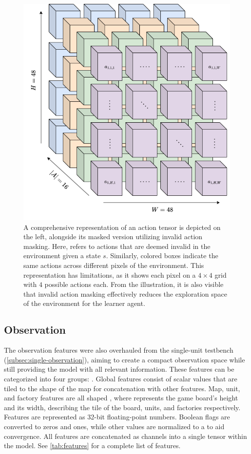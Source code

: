 \begin{figure}[htbp]
    \centering
    \includegraphics[width=0.5\linewidth]{images/methods_mono/action/action_space.png}
    \captionsetup{justification=justified, singlelinecheck=false, width=1\linewidth, labelfont=bf} 
    \caption[]{A comprehensive representation of an action tensor is depicted on the left, alongside its masked version utilizing invalid action masking. Here,  refers to actions that are deemed invalid in the environment given a state $s$. Similarly, colored boxes indicate the same actions across different pixels of the environment. This representation has limitations, as it shows each pixel on a $4\times4$ grid with $4$ possible actions each. From the illustration, it is also visible that invalid action masking effectively reduces the exploration space of the environment for the learner agent.}
    \label{fig:action_space_mono}
\end{figure}

\subsection{Observation}
\label{subsec:mono-observation}

\noindent The observation features were also overhauled from the single-unit testbench (\autoref{subsec:single-observation}), aiming to create a compact observation space while still providing the model with all relevant information. These features can be categorized into four groups: . Global features consist of scalar values that are tiled to the shape of the map for concatenation with other features. Map, unit, and factory features are all shaped , where  represents the game board's height and  its width, describing the tile of the board, units, and factories respectively. Features are represented as 32-bit floating-point numbers. Boolean flags are converted to zeros and ones, while other values are normalized to a  to aid convergence. All features are concatenated as channels into a single tensor within the model. See \autoref{tab:features} for a complete list of features.


